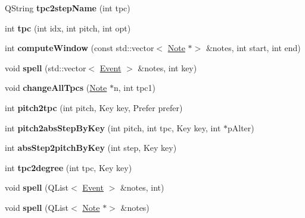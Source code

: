 \begin{DoxyCompactItemize}
\mbox{\label{namespace_ms_a9891b023627446f284e18a968e1face9}} 
Q\+String {\bfseries tpc2step\+Name} (int tpc)
\item 
\mbox{\label{namespace_ms_a2e97eaee358b108fee65ce7d9e414450}} 
int {\bfseries tpc} (int idx, int pitch, int opt)
\item 
\mbox{\label{namespace_ms_ad682b85c5e06dfa92347042b16689322}} 
int {\bfseries compute\+Window} (const std\+::vector$<$ \hyperlink{class_ms_1_1_note}{Note} $\ast$$>$ \&notes, int start, int end)
\item 
\mbox{\label{namespace_ms_a6edb96bd595b3ee9d420448235f4d133}} 
void {\bfseries spell} (std\+::vector$<$ \hyperlink{class_ms_1_1_event}{Event} $>$ \&notes, int key)
\item 
\mbox{\label{namespace_ms_a923934c478b842516e079ba55fe28bfc}} 
void {\bfseries change\+All\+Tpcs} (\hyperlink{class_ms_1_1_note}{Note} $\ast$n, int tpc1)
\item 
\mbox{\label{namespace_ms_aa3cf0f906ff1a7faf563b047c31b5860}} 
int {\bfseries pitch2tpc} (int pitch, Key key, Prefer prefer)
\item 
\mbox{\label{namespace_ms_ad89b44de9feb7ebb70bd782470091200}} 
int {\bfseries pitch2abs\+Step\+By\+Key} (int pitch, int tpc, Key key, int $\ast$p\+Alter)
\item 
\mbox{\label{namespace_ms_a28219a812713779b522bb0ec81ee1f83}} 
int {\bfseries abs\+Step2pitch\+By\+Key} (int step, Key key)
\item 
\mbox{\label{namespace_ms_ad0ca5fdbebfd0e32692effdfa4d60ca1}} 
int {\bfseries tpc2degree} (int tpc, Key key)
\item 
\mbox{\label{namespace_ms_a297cba695d59c0c35cc139b36d28fc23}} 
void {\bfseries spell} (Q\+List$<$ \hyperlink{class_ms_1_1_event}{Event} $>$ \&notes, int)
\item 
\mbox{\label{namespace_ms_a776043ccaa08b2ac91feb31954d27252}} 
void {\bfseries spell} (Q\+List$<$ \hyperlink{class_ms_1_1_note}{Note} $\ast$$>$ \&notes)

\end{DoxyCompactItemize}
